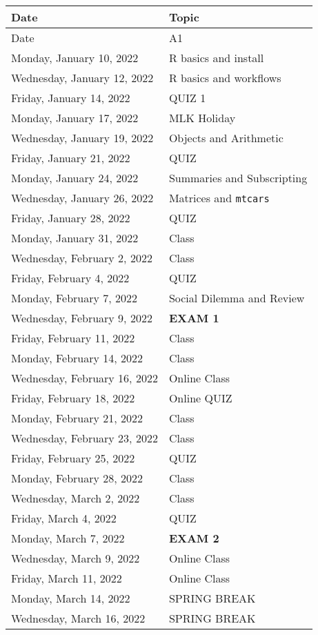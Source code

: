 \documentclass[
]{book}
\begin{document}
\begin{longtable}[]{@{}ll@{}}
\toprule
Date & Topic \\
\midrule
\endhead
Date & A1 \\
Monday, January 10, 2022 & R basics and install \\
Wednesday, January 12, 2022 & R basics and workflows \\
Friday, January 14, 2022 & QUIZ 1 \\
Monday, January 17, 2022 & MLK Holiday \\
Wednesday, January 19, 2022 & Objects and Arithmetic \\
Friday, January 21, 2022 & QUIZ \\
Monday, January 24, 2022 & Summaries and Subscripting \\
Wednesday, January 26, 2022 & Matrices and \texttt{mtcars} \\
Friday, January 28, 2022 & QUIZ \\
Monday, January 31, 2022 & Class \\
Wednesday, February 2, 2022 & Class \\
Friday, February 4, 2022 & QUIZ \\
Monday, February 7, 2022 & Social Dilemma and Review \\
Wednesday, February 9, 2022 & \textbf{EXAM 1} \\
Friday, February 11, 2022 & Class \\
Monday, February 14, 2022 & Class \\
Wednesday, February 16, 2022 & Online Class \\
Friday, February 18, 2022 & Online QUIZ \\
Monday, February 21, 2022 & Class \\
Wednesday, February 23, 2022 & Class \\
Friday, February 25, 2022 & QUIZ \\
Monday, February 28, 2022 & Class \\
Wednesday, March 2, 2022 & Class \\
Friday, March 4, 2022 & QUIZ \\
Monday, March 7, 2022 & \textbf{EXAM 2} \\
Wednesday, March 9, 2022 & Online Class \\
Friday, March 11, 2022 & Online Class \\
Monday, March 14, 2022 & SPRING BREAK \\
Wednesday, March 16, 2022 & SPRING BREAK \\

\end{longtable}
\end{document}
